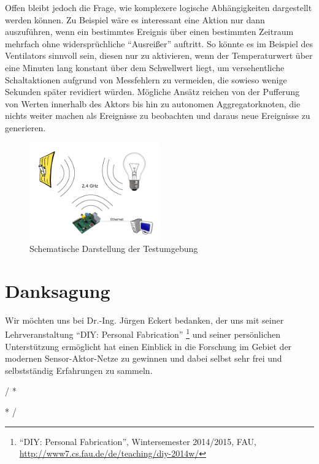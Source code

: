 \documentclass{IEEEtran}
\begin{document}
    Offen bleibt jedoch die Frage, wie komplexere logische Abhängigkeiten
    dargestellt werden können.
    Zu Beispiel wäre es interessant eine Aktion nur dann auszuführen,
    wenn ein bestimmtes Ereignis über einen bestimmten Zeitraum mehrfach ohne
    widersprüchliche \enquote{Ausreißer} auftritt.
    So könnte es im Beispiel des Ventilators sinnvoll sein, diesen nur zu
    aktivieren, wenn der Temperaturwert über eine Minuten lang konstant über
    dem Schwellwert liegt, um versehentliche Schaltaktionen aufgrund von
    Messfehlern zu vermeiden, die sowieso wenige Sekunden später revidiert
    würden. Mögliche Ansätz reichen von der Pufferung von
    Werten innerhalb des Aktors bis hin zu autonomen Aggregatorknoten,
    die nichts weiter machen als Ereignisse zu beobachten und daraus
    neue Ereignisse zu generieren.


        \begin{figure}
            \centering
            \includegraphics[width=0.5\textwidth]{img/system}
            \caption{Schematische Darstellung der Testumgebung}
            \label{fig:comp}
        \end{figure}


\section{Danksagung}
    Wir möchten uns bei Dr.-Ing. Jürgen Eckert bedanken,
    der uns mit seiner Lehrveranstaltung \enquote{DIY: Personal Fabrication}
    \footnote{\enquote{DIY: Personal Fabrication}, Wintersemester 2014/2015, FAU,
    \url{http://www7.cs.fau.de/de/teaching/diy-2014w/}}
    und seiner persönlichen Unterstützung ermöglicht hat
    einen Einblick in die Forschung im Gebiet der modernen
    Sensor-Aktor-Netze zu gewinnen und dabei selbst sehr frei
    und selbstständig Erfahrungen zu sammeln.



\renewcommand{\IEEEiedlistdecl}{\IEEEsetlabelwidth{CSMA/CA}}
\begin{acronym}
\end{acronym}
\renewcommand{\IEEEiedlistdecl}{\relax}%

\comment / *
\listoffigures
\clearpage

\listoftables
\clearpage
* /




\end{document}
